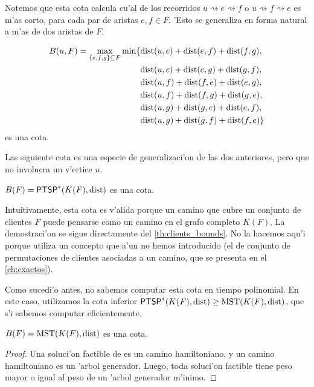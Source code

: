 Notemos que esta cota calcula cu'al de los recorridos $u \rightsquigarrow e \rightsquigarrow f$ o $u \rightsquigarrow f \rightsquigarrow e$ es m'as corto, para cada par de aristas $e, f \in F$. 'Esto se generaliza en forma natural a m'as de dos aristas de $F$.

\begin{theorem}
\label{th:cota_dist_x3}
\begin{align*}
B(u, F) = \max\limits_{\{e, f, g\} \subseteq F} \min\{
&\textnormal{dist}(u, e) + \textnormal{dist}(e, f) + \textnormal{dist}(f, g),\\
&\textnormal{dist}(u, e) + \textnormal{dist}(e, g) + \textnormal{dist}(g, f),\\
&\textnormal{dist}(u, f) + \textnormal{dist}(f, e) + \textnormal{dist}(e, g),\\
&\textnormal{dist}(u, f) + \textnormal{dist}(f, g) + \textnormal{dist}(g, e),\\
&\textnormal{dist}(u, g) + \textnormal{dist}(g, e) + \textnormal{dist}(e, f),\\
&\textnormal{dist}(u, g) + \textnormal{dist}(g, f) + \textnormal{dist}(f, e)\}
\end{align*}
es una cota.
\end{theorem}

Las siguiente cota es una especie de generalizaci'on de las dos anteriores, pero que no involucra un v'ertice $u$.

\begin{theorem}
$B(F) = \textnormal{\textsf{PTSP}}^*(K(F), \textnormal{dist})$ es una cota.
\end{theorem}

Intuitivamente, esta cota es v'alida porque un camino que cubre un conjunto de clientes $F$ puede pensarse como un camino en el grafo completo $K(F)$. La demostraci'on se sigue directamente del \autoref{th:clients_bounds}. No la hacemos aqu'i porque utiliza un concepto que a'un no hemos introducido (el de conjunto de permutaciones de clientes asociadas a un camino, que se presenta en el \autoref{ch:exactos}).

Como sucedi'o antes, no sabemos computar esta cota en tiempo polinomial. En este caso, utilizamos la cota inferior $\textnormal{\textsf{PTSP}}^*(K(F), \textnormal{dist}) \geq \textnormal{MST}(K(F), \textnormal{dist})$, que s'i sabemos computar eficientemente.

\begin{corollary}
\label{co:cota_mst}
$B(F) = \textnormal{MST}(K(F), \textnormal{dist})$ es una cota.

\begin{proof}
Una soluci'on factible de  es un camino hamiltoniano, y un camino hamiltoniano es un 'arbol generador. Luego, toda soluci'on factible tiene peso mayor o igual al peso de un 'arbol generador m'inimo.
\end{proof}
\end{corollary}

